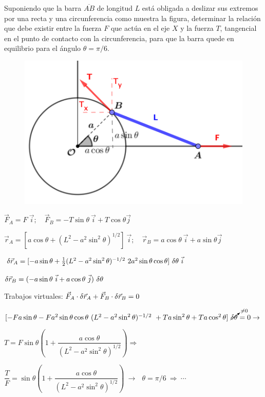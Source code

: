 \begin{prob}
Suponiendo que la barra $\overline{AB}$ de longitud $L$ está obligada a deslizar sus extremos por una recta y una circunferencia como muestra la figura, determinar la relación que debe existir entre la fuerza $F$ que actúa en el eje $X$ y la fuerza $T$, tangencial en el punto de contacto con la circunferencia, para que la barra quede en equilibrio para el ángulo $\theta=\pi/6$.	
\end{prob}
\begin{figure}[H]
	\centering
	\includegraphics[width=.75\textwidth]{imagenes/imagenes06/T06IM10.png}
\end{figure}

$\vec F_A=F\ \vec i;\quad \vec F_B=-T\sin \theta \ \vec i + T\cos \theta \vec j$

$\vec r_A=[a\cos \theta +(L^2-a^2\sin^2 \theta)^{1/2}]\ \vec i; \quad \vec r_B=a\cos \theta \ \vec i + a \sin \theta \vec j$

$\var \vec r_A=[-a \sin \theta + \frac 1 2 (L^2-a^2 \sin^2 \theta)^{-1/2}\ 2 a^2 \sin\theta \cos \theta] \ \var \theta \ \vec i$

$\var \vec r_B=(-a \sin \theta \ \vec i+a\cos \theta \ \vec j)\ \var \theta$


Trabajos virtuales:  $\vec F_A \cdot \var \vec r_A+\vec F_B \cdot \var \vec r_B=0$


\small{$[-F a \sin \theta -F a^2 \sin \theta \cos \theta \ (L^2-a^2\sin^2 \theta)^{-1/2}\ + T a \sin^2 \theta + T a \cos^2 \theta]\ \cancelto{\neq 0}{\var \theta}=0 \to$}

\normalsize{$T=F\sin \theta \left( 1 + \dfrac{a \cos \theta}{(L^2-a^2\sin^2 \theta)^{1/2}} \right) \Rightarrow$}

$\dfrac T F = \sin \theta \left( 1+\dfrac {a \cos \theta}{(L^2-a^2\sin^2 \theta)^{1/2}}  \right) \ \to \ \ \ \theta=\pi/6 \ \Rightarrow \ \cdots$

